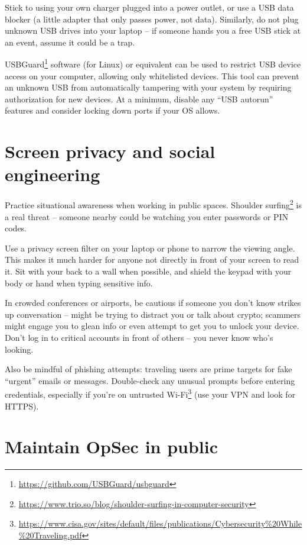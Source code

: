 Stick to using your own charger plugged into a power
outlet, or use a USB data blocker (a little adapter that
only passes power, not data). Similarly, do not plug
unknown USB drives into your laptop -- if someone hands
you a free USB stick at an event, assume it could be a
trap.

USBGuard\footnote{\url{https://github.com/USBGuard/usbguard}}
software (for Linux) or equivalent can be used to restrict
USB device access on your computer, allowing only
whitelisted devices. This tool can prevent an unknown USB
from automatically tampering with your system by requiring
authorization for new devices. At a minimum, disable any
``USB autorun'' features and consider locking down ports
if your OS allows.

\section{Screen privacy and social engineering}

Practice situational awareness when working in public
spaces. Shoulder
surfing\footnote{\url{https://www.trio.so/blog/shoulder-surfing-in-computer-security}}
is a real threat -- someone nearby could be watching you
enter passwords or PIN codes.

Use a privacy screen filter on your laptop or phone to
narrow the viewing angle. This makes it much harder for
anyone not directly in front of your screen to read it.
Sit with your back to a wall when possible, and shield the
keypad with your body or hand when typing sensitive info.

In crowded conferences or airports, be cautious if someone
you don't know strikes up conversation -- might be trying
to distract you or talk about crypto; scammers might
engage you to glean info or even attempt to get you to
unlock your device. Don't log in to critical accounts in
front of others -- you never know who's looking.

Also be mindful of phishing attempts: traveling users are
prime targets for fake ``urgent'' emails or messages.
Double-check any unusual prompts before entering
credentials, especially if you're on untrusted
Wi-Fi\footnote{\url{https://www.cisa.gov/sites/default/files/publications/Cybersecurity\%20While\%20Traveling.pdf}}
(use your VPN and look for HTTPS).

\section{Maintain OpSec in public}


